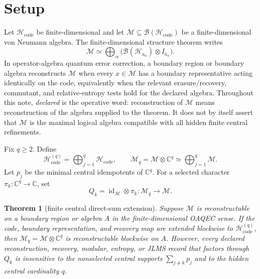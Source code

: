 \documentclass[12pt]{article}
\newtheorem{theorem}{Theorem}
\theoremstyle{remark}
\newcommand{\B}{\mathcal B}
\newcommand{\C}{\mathbb C}
\newcommand{\Hcode}{\mathcal H_{\mathrm{code}}}
\newcommand{\M}{\mathcal M}
\newcommand{\id}{\operatorname{id}}
\begin{document}
\section{Setup}

Let \(\Hcode\) be finite-dimensional and let
\(\M\subseteq\B(\Hcode)\) be a finite-dimensional von Neumann algebra.  The
finite-dimensional structure theorem writes
\[
  \M \simeq \bigoplus_{\alpha}
  \bigl(\B(\mathcal H_{a_\alpha})\otimes I_{\bar a_\alpha}\bigr).
\]
In operator-algebra quantum error correction, a boundary region or boundary
algebra reconstructs \(\M\) when every \(x\in\M\) has a boundary
representative acting identically on the code, equivalently when the relevant
erasure/recovery, commutant, and relative-entropy tests hold for the declared
algebra.  Throughout this note, \emph{declared} is the operative word:
reconstruction of \(\M\) means reconstruction of the algebra supplied to the
theorem.  It does not by itself assert that \(\M\) is the maximal logical
algebra compatible with all hidden finite central refinements.

Fix \(q\geq 2\).  Define
\[
  \Hcode^{(q)}=\bigoplus_{j=1}^{q}\Hcode,\qquad
  \M_q=\M\otimes \C^q\simeq\bigoplus_{j=1}^{q}\M.
\]
Let \(p_j\) be the minimal central idempotents of \(\C^q\).  For a selected
character \(\pi_k:\C^q\to\C\), set
\[
  Q_k=\id_{\M}\otimes \pi_k:\M_q\to\M.
\]

\begin{theorem}[finite central direct-sum extension]
\label{thm:oaqec-direct-sum}
Suppose \(\M\) is reconstructable on a boundary region or algebra \(A\) in the
finite-dimensional OAQEC sense.  If the code, boundary representation, and
recovery map are extended blockwise to \(\Hcode^{(q)}\), then
\(\M_q=\M\otimes\C^q\) is reconstructable blockwise on \(A\).  However, every
declared reconstruction, recovery, modular, entropy, or JLMS record that
factors through \(Q_k\) is insensitive to the nonselected central supports
\(\sum_{j\ne k}p_j\) and to the hidden central cardinality \(q\).
\end{theorem}
\end{document}
